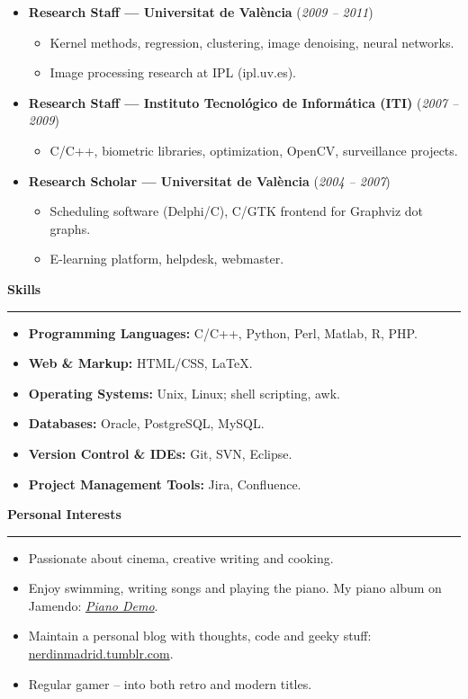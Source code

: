 \documentclass[10pt,a4paper]{article}
\newcommand{\sect}[1]{\vspace{6pt}\noindent\textbf{\large #1}\vspace{2pt}\hrule\vspace{6pt}}
\newcommand{\subsect}[1]{\vspace{4pt}\textbf{#1}}
\begin{document}
\begin{itemize}[leftmargin=*]
\item \subsect{Research Staff — Universitat de València} (\textit{2009 -- 2011})
\begin{itemize}[leftmargin=*,label={}]
    \item Kernel methods, regression, clustering, image denoising, neural networks.
    \item Image processing research at IPL (ipl.uv.es).
\end{itemize}

\item \subsect{Research Staff — Instituto Tecnológico de Informática (ITI)} (\textit{2007 -- 2009})
\begin{itemize}[leftmargin=*,label={}]
\item C/C++, biometric libraries, optimization, OpenCV, surveillance projects.
\end{itemize}

\item \subsect{Research Scholar — Universitat de València} (\textit{2004 -- 2007})
\begin{itemize}[leftmargin=*,label={}]
    \item Scheduling software (Delphi/C), C/GTK frontend for Graphviz dot graphs.
    \item E-learning platform, helpdesk, webmaster.
\end{itemize}

\end{itemize}

\sect{Skills}
\begin{itemize}[leftmargin=*]
    \item \textbf{Programming Languages:} C/C++, Python, Perl, Matlab, R, PHP.
    \item \textbf{Web \& Markup:} HTML/CSS, LaTeX.
    \item \textbf{Operating Systems:} Unix, Linux; shell scripting, awk.
    \item \textbf{Databases:} Oracle, PostgreSQL, MySQL.
    \item \textbf{Version Control \& IDEs:} Git, SVN, Eclipse.
    \item \textbf{Project Management Tools:} Jira, Confluence.
\end{itemize}

\sect{Personal Interests}
\begin{itemize}[leftmargin=*]
    \item Passionate about cinema, creative writing and cooking.
    \item Enjoy swimming, writing songs and playing the piano. My piano album on Jamendo: \href{https://www.jamendo.com/album/51633/piano-demo}{\textit{Piano Demo}}.
    \item Maintain a personal blog with thoughts, code and geeky stuff: \href{https://nerdinmadrid.tumblr.com/}{nerdinmadrid.tumblr.com}.
    \item Regular gamer -- into both retro and modern titles.
\end{itemize}
\end{document}
